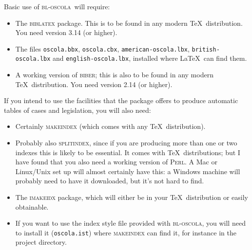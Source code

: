 \documentclass[a4paper,
               11pt,
	       DIV=1,			   
	       footinclude=false]
	      {scrartcl}
\newcommand{\oscola}{\textsc{bl-oscola}}
\begin{document}
Basic use of \oscola\ will require:
\begin{itemize}
\item The \textsc{biblatex} package. This is to be found in any modern
  \TeX\ distribution. You need version 3.14 (or higher).
\item The files \texttt{oscola.bbx}, \texttt{oscola.cbx}, \texttt{american-oscola.lbx}, \texttt{british-oscola.lbx} and
  \texttt{english-oscola.lbx}, installed where \LaTeX\ can find them.
\item A working version of \textsc{biber}; this is also to be found in
  any modern \TeX\ distribution. You need version 2.14 (or higher).
\end{itemize}

If you intend to use the facilities that the package offers to produce
automatic tables of cases and legislation, you will also need:
\begin{itemize}
\item Certainly \textsc{makeindex} (which comes with any \TeX\ distribution).
\item Probably also \textsc{splitindex}, since if you are producing
  more than one or two indexes this is likely to be essential. It
  comes with \TeX\ distributions; but I have found that you also need
  a working version of \textsc{Perl}. A Mac or Linux\slash Unix set up
  will almost certainly have this: a Windows machine will probably
  need to have it downloaded, but it's not hard to find.
\item The \textsc{imakeidx} package, which will either be in your
  \TeX\ distribution or easily obtainable.
\item If you want to use the index style file provided with \oscola,
  you will need to install it (\texttt{oscola.ist}) where
  \textsc{makeindex} can find it, for instance in the project
  directory.
\end{itemize}
\end{document}
